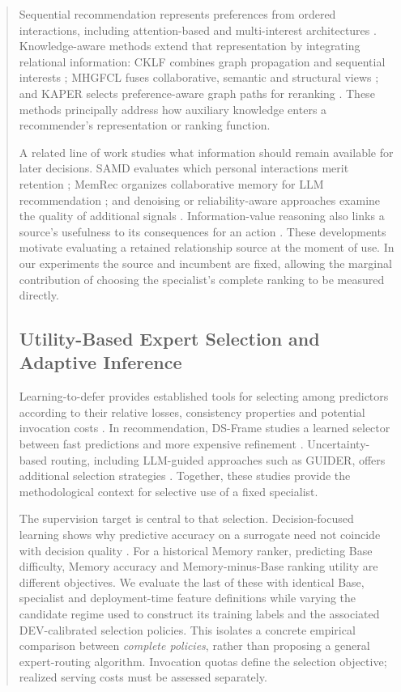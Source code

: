 \begin{abstract}
Sequential recommendation represents preferences from ordered interactions, including attention-based and multi-interest architectures \cite{kang2018sasrec,sun2019bert4rec,ni2025idmarec,sheng2025dsmgrec}. Knowledge-aware methods extend that representation by integrating relational information: CKLF combines graph propagation and sequential interests \cite{chen2024cklf}; MHGFCL fuses collaborative, semantic and structural views \cite{xie2026mhgfcl}; and KAPER selects preference-aware graph paths for reranking \cite{kim2026kaper}. These methods principally address how auxiliary knowledge enters a recommender's representation or ranking function.

A related line of work studies what information should remain available for later decisions. SAMD evaluates which personal interactions merit retention \cite{zhong2026samd}; MemRec organizes collaborative memory for LLM recommendation \cite{chen2026memrec}; and denoising or reliability-aware approaches examine the quality of additional signals \cite{peng2025negative,zhu2026mifusr,zhang2026mcd4sr}. Information-value reasoning also links a source's usefulness to its consequences for an action \cite{abbas2025voi}. These developments motivate evaluating a retained relationship source at the moment of use. In our experiments the source and incumbent are fixed, allowing the marginal contribution of choosing the specialist's complete ranking to be measured directly.

\subsection{Utility-Based Expert Selection and Adaptive Inference}

Learning-to-defer provides established tools for selecting among predictors according to their relative losses, consistency properties and potential invocation costs \cite{mozannar2020defer,narasimhan2022posthoc,mao2024regression,mao2025mastering}. In recommendation, DS-Frame studies a learned selector between fast predictions and more expensive refinement \cite{yuan2026dsframe}. Uncertainty-based routing, including LLM-guided approaches such as GUIDER, offers additional selection strategies \cite{xu2026guider}. Together, these studies provide the methodological context for selective use of a fixed specialist.

The supervision target is central to that selection. Decision-focused learning shows why predictive accuracy on a surrogate need not coincide with decision quality \cite{mandi2024decisionfocused}. For a historical Memory ranker, predicting Base difficulty, Memory accuracy and Memory-minus-Base ranking utility are different objectives. We evaluate the last of these with identical Base, specialist and deployment-time feature definitions while varying the candidate regime used to construct its training labels and the associated DEV-calibrated selection policies. This isolates a concrete empirical comparison between \emph{complete policies}, rather than proposing a general expert-routing algorithm. Invocation quotas define the selection objective; realized serving costs must be assessed separately.


\end{abstract}
